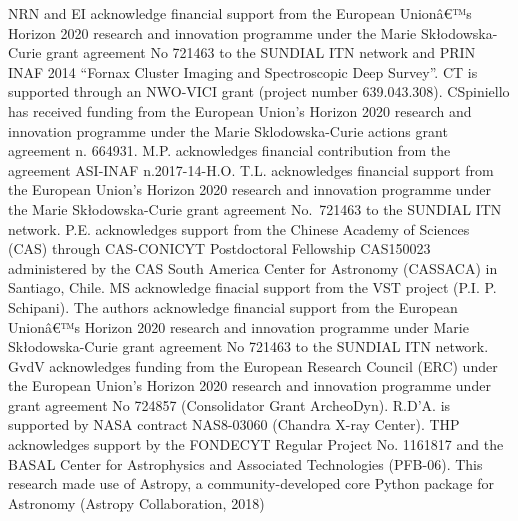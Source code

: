 \documentclass[useAMS,usenatbib]{mn2e}
\begin{document}
NRN and EI acknowledge financial support from the European Unionâ€™s Horizon
2020 research and innovation programme under the Marie Sk\l{}odowska-Curie
grant agreement No 721463 to the SUNDIAL ITN network and  PRIN INAF 2014 
``Fornax Cluster Imaging and Spectroscopic Deep Survey''.
CT is supported through an NWO-VICI grant (project number 639.043.308).
CSpiniello has received funding from the European Union's Horizon 2020 
research and innovation programme under the Marie Sklodowska-Curie 
actions grant agreement n. 664931.
M.P. acknowledges financial contribution from the agreement ASI-INAF n.2017-14-H.O.
T.L. acknowledges financial support from the European Union's Horizon 2020 
research and innovation programme under the Marie Sk\l{}odowska-Curie 
grant agreement No.\ 721463 to the SUNDIAL ITN network.
P.E. acknowledges support from the Chinese Academy of Sciences (CAS) 
through CAS-CONICYT Postdoctoral  Fellowship CAS150023 administered 
by the CAS South America Center for Astronomy (CASSACA) in Santiago,  Chile.
MS acknowledge finacial support from the VST project (P.I. P. Schipani).
The authors acknowledge financial support from the European Unionâ€™s 
Horizon 2020 research and innovation programme under Marie Sk\l{}odowska-Curie 
grant agreement No 721463 to the SUNDIAL ITN network.
GvdV acknowledges funding from the European Research Council (ERC) under 
the European Union's Horizon 2020 research and innovation programme 
under grant agreement No 724857 (Consolidator Grant ArcheoDyn).
R.D'A. is supported by NASA contract NAS8-03060 (Chandra X-ray Center).
THP acknowledges support by the FONDECYT Regular Project No. 1161817 and 
the BASAL Center for Astrophysics and Associated Technologies (PFB-06).
This research made use of Astropy, a community-developed core Python 
package for Astronomy (Astropy Collaboration, 2018)



\end{document}
